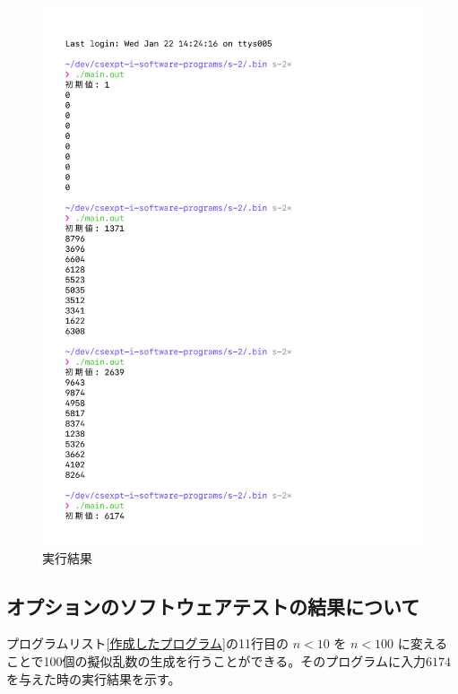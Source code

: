 \begin{figure}[H]
    \ContinuedFloat
    \centering
    \includegraphics[width=0.8\hsize, pagebox=mediabox, page=3]{main_result_img.pdf}
    \caption{実行結果}
    \label{実行結果}
\end{figure}


\subsection{オプションのソフトウェアテストの結果について}

プログラムリスト\ref{作成したプログラム}の11行目の $n < 10$ を $n < 100$ に変えることで100個の擬似乱数の生成を行うことができる。そのプログラムに入力$6174$を与えた時の実行結果を示す。

